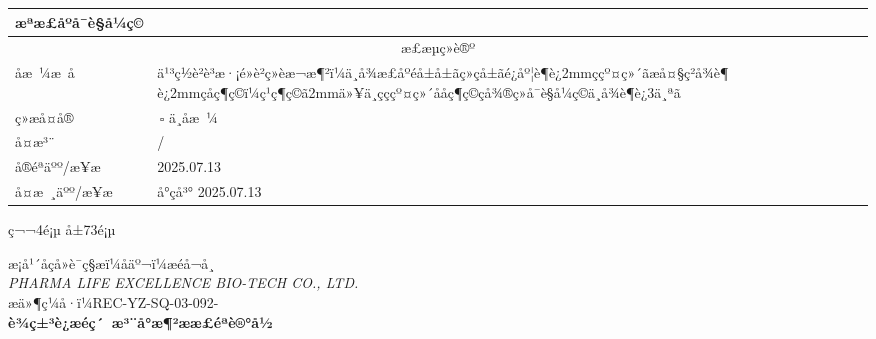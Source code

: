 \documentclass[UTF8,10pt,a4paper,fontset=fandol]{ctexart}
\newcommand{\fieldvalue}[1]{#1}
\newcommand{\handwritten}[1]{#1}
\begin{document}
\begin{tabularx}    {\textwidth}{|X|c|c|}
{%
\handwritten{æªæ£åºå¯è§å¼ç©}
}\\
\hline
\multicolumn{3}{|c|}{æ£æµç»è®º}\\
\hline
åæ ¼æ å &
\multicolumn{2}{l|}{ä¹³ç½è²è³æ·¡é»è²ç»èæ¬æ¶²ï¼ä¸å¾æ£åºéå±å±ãç»çå±ãé¿åº¦è¶è¿2mmççº¤ç»´ãæå¤§ç²å¾è¶è¿2mmçåç¶ç©ï¼ç¹ç¶ç©ã2mmä»¥ä¸çç­çº¤ç»´ååç¶ç©ç­å¾®ç»å¯è§å¼ç©ä¸å¾è¶è¿3ä¸ªã}\\
\hline
ç»æå¤å® &
\multicolumn{2}{l|}{
\fieldvalue{\handwritten{\checkmark}\,\text{åæ ¼}}\qquad $\square$ ä¸åæ ¼}\\
\hline
å¤æ³¨ &
\multicolumn{2}{l|}{
\fieldvalue{\handwritten{/}}}\\
\hline
å®éªäºº/æ¥æ &
\multicolumn{2}{l|}{
\fieldvalue{\handwritten{2025.07.13}}}\\
\hline
å¤æ ¸äºº/æ¥æ &
\multicolumn{2}{l|}{
\fieldvalue{\handwritten{å°çå³°}}\quad
\fieldvalue{\handwritten{2025.07.13}}}\\
\hline
\end{tabularx}

\begin{center}
ç¬¬4é¡µ å±73é¡µ
\end{center}

\newpage

\begin{center}
\small
æ¡å¹´åçå»è¯ç§æï¼åäº¬ï¼æéå¬å¸\\
\textit{PHARMA LIFE EXCELLENCE BIO-TECH CO., LTD.}\\[2mm]
æä»¶ç¼å·ï¼REC-YZ-SQ-03-092-\underline{\hspace{8mm}}\\
\textbf{è¾ç±³è¿æéç´ æ³¨å°æ¶²ææ£éªè®°å½}
\end{center}
\end{document}
